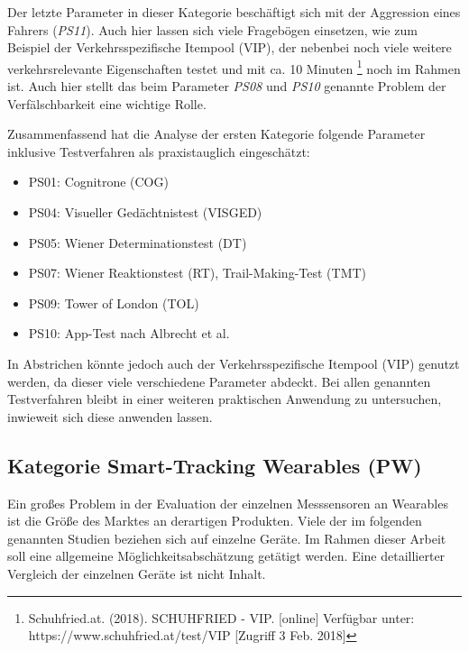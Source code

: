 Der letzte Parameter in dieser Kategorie beschäftigt sich mit der Aggression eines Fahrers (\textit{PS11}). Auch hier lassen sich viele Fragebögen einsetzen, wie zum Beispiel der Verkehrsspezifische Itempool (VIP), der nebenbei noch viele weitere verkehrsrelevante Eigenschaften testet und mit ca. 10 Minuten \footnote{Schuhfried.at. (2018). SCHUHFRIED - VIP. [online] Verfügbar unter: https://www.schuhfried.at/test/VIP [Zugriff 3 Feb. 2018]} noch im Rahmen ist. Auch hier stellt das beim Parameter \textit{PS08} und \textit{PS10} genannte Problem der Verfälschbarkeit eine wichtige Rolle.

Zusammenfassend hat die Analyse der ersten Kategorie folgende Parameter inklusive Testverfahren als praxistauglich eingeschätzt:

\begin{itemize}
	\setlength\itemsep{2pt}
	\item PS01: Cognitrone (COG) 
	\item PS04: Visueller Gedächtnistest (VISGED) 
	\item PS05: Wiener Determinationstest (DT) 
	\item PS07: Wiener Reaktionstest (RT), Trail-Making-Test (TMT) 
	\item PS09: Tower of London (TOL) 
	\item PS10: App-Test nach Albrecht et al. \cite{mobilesmarttracking} 
\end{itemize}

In Abstrichen könnte jedoch auch der Verkehrsspezifische Itempool (VIP) genutzt werden, da dieser viele verschiedene Parameter abdeckt. Bei allen genannten Testverfahren bleibt in einer weiteren praktischen Anwendung zu untersuchen, inwieweit sich diese anwenden lassen.

\subsection{Kategorie Smart-Tracking Wearables (PW)}

Ein großes Problem in der Evaluation der einzelnen Messsensoren an Wearables ist die Größe des Marktes an derartigen Produkten. Viele der im folgenden genannten Studien beziehen sich auf einzelne Geräte. Im Rahmen dieser Arbeit soll eine allgemeine Möglichkeitsabschätzung getätigt werden. Eine detaillierter Vergleich der einzelnen Geräte ist nicht Inhalt.

